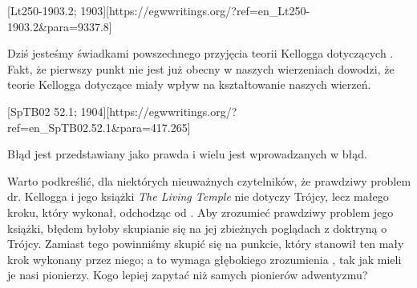 [Lt250-1903.2; 1903][https://egwwritings.org/?ref=en\_Lt250-1903.2&para=9337.8]

Dziś jesteśmy świadkami powszechnego przyjęcia teorii Kellogga dotyczących . Fakt, że pierwszy punkt  nie jest już obecny w naszych wierzeniach dowodzi, że teorie Kellogga dotyczące  miały wpływ na kształtowanie naszych wierzeń.

[SpTB02 52.1; 1904][https://egwwritings.org/?ref=en\_SpTB02.52.1&para=417.265]

Błąd jest przedstawiany jako prawda i wielu jest wprowadzanych w błąd.

Warto podkreślić, dla niektórych nieuważnych czytelników, że prawdziwy problem dr. Kellogga i jego książki \textit{The Living Temple} nie dotyczy Trójcy, lecz małego kroku, który wykonał, odchodząc od . Aby zrozumieć prawdziwy problem jego książki, błędem byłoby skupianie się na jej zbieżnych poglądach z doktryną o Trójcy. Zamiast tego powinniśmy skupić się na punkcie, który stanowił ten mały krok wykonany przez niego; a to wymaga głębokiego zrozumienia , tak jak mieli je nasi pionierzy. Kogo lepiej zapytać niż samych pionierów adwentyzmu?
